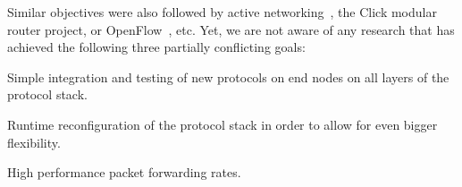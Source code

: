 \documentclass{sig-alternate}
\begin{document}

Similar objectives were also followed by active networking~\cite{ANSurvey2}, the Click modular router
project\cite{click}, or OpenFlow~\cite{openflow}, etc. 
Yet, we are not aware of any research that has achieved the following three partially conflicting goals:
\begin{compactenum}
\item Simple integration and testing of new protocols on end nodes on all layers of the protocol stack.
\item Runtime reconfiguration of the protocol stack in order to allow for even bigger flexibility.
\item High performance packet forwarding rates.
\end{compactenum}
\end{document}

